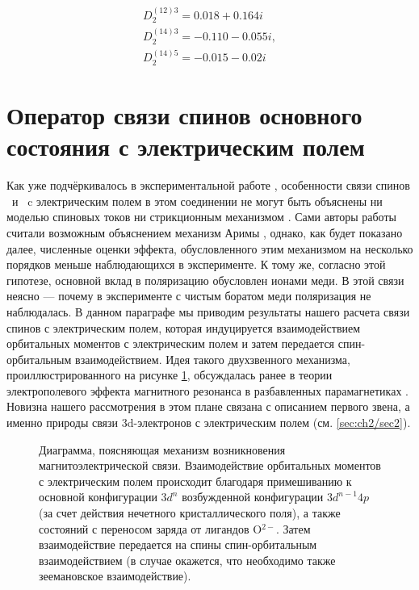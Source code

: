 \begin{equation}
	\label{eq:Dparams}
	\begin{array}{l}
		D_{2}^{(12) 3}=0.018+0.164 i   \\
		D_{2}^{(14) 3}=-0.110-0.055 i, \\
		D_{2}^{(14) 5}=-0.015-0.02 i
	\end{array}
\end{equation}

\section{Оператор связи спинов основного состояния с электрическим полем}\label{sec:ch2/sec3}

Как уже подчёркивалось в экспериментальной работе \cite{Khanh2013}, особенности связи спинов \cu\ и \niIon\ c электрическим полем в этом соединении не могут быть объяснены ни моделью спиновых токов \cite{Katsura2005} ни стрикционным механизмом \cite{Sergienko2006}. Сами авторы работы \cite{Khanh2013} считали возможным объяснением механизм Аримы \cite{Arima2007}, однако, как будет показано далее, численные оценки эффекта, обусловленного этим механизмом на несколько порядков меньше наблюдающихся в эксперименте. К тому же, согласно этой гипотезе, основной вклад в поляризацию обусловлен ионами меди. В этой связи неясно --- почему в эксперименте с чистым боратом меди \cite{Nenert2007} поляризация не наблюдалась. 
В данном параграфе мы приводим результаты нашего расчета связи спинов с электрическим полем, которая индуцируется взаимодействием орбитальных моментов с электрическим полем и затем передается спин-орбитальным взаимодействием. Идея такого двухзвенного механизма, проиллюстрированного на рисунке \cref{fig:perturbation_model}, обсуждалась ранее в теории электрополевого эффекта магнитного резонанса в разбавленных парамагнетиках \cite{Mims}. Новизна нашего рассмотрения в этом плане связана с описанием первого звена, а именно природы связи 3d-электронов с электрическим полем (см. \cref{sec:ch2/sec2}). 

\begin{figure}[ht]
	\caption{Диаграмма, поясняющая механизм возникновения магнитоэлектрической связи. Взаимодействие орбитальных моментов с электрическим полем происходит благодаря примешиванию к основной конфигурации \(3d^n\) возбужденной конфигурации \(3d^{n-1}4p\) (за счет действия нечетного кристаллического поля), а также состояний с переносом заряда от лигандов O\(^{2-}\). Затем взаимодействие передается на спины  спин-орбитальным взаимодействием (в случае \cu окажется, что необходимо также зеемановское взаимодействие).}
	\label{fig:perturbation_model}
\end{figure}


